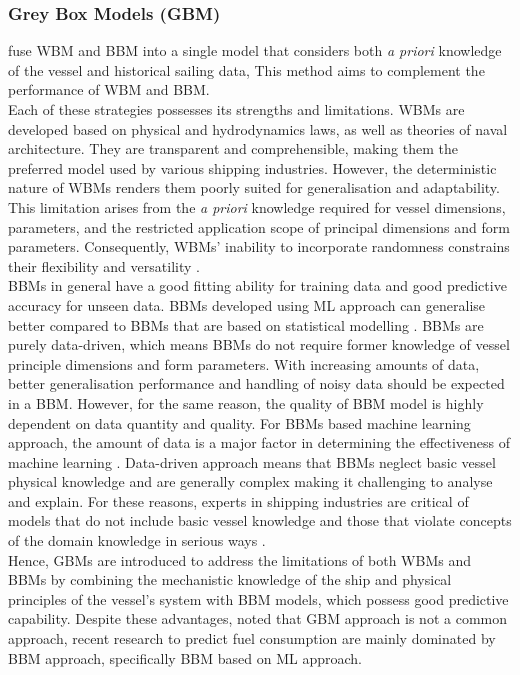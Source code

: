 \subsubsection*{\textbf{Grey Box Models (GBM)}} fuse WBM and BBM into a single model that considers both \emph{a priori} knowledge of the vessel and historical sailing data, This method aims to complement the performance of WBM and BBM.\\

Each of these strategies possesses its strengths and limitations. WBMs are developed based on physical and hydrodynamics laws, as well as theories of naval architecture. They are transparent and comprehensible, making them the preferred model used by various shipping industries. However, the deterministic nature of WBMs renders them poorly suited for generalisation and adaptability. This limitation arises from the \emph{a priori} knowledge required for vessel dimensions, parameters, and the restricted application scope of principal dimensions and form parameters. Consequently, WBMs' inability to incorporate randomness constrains their flexibility and versatility .\\

BBMs in general have a good fitting ability for training data and good predictive accuracy for unseen data. BBMs developed using ML approach can generalise better compared to BBMs that are based on statistical modelling . BBMs are purely data-driven, which means BBMs do not require former knowledge of vessel principle dimensions and form parameters. With increasing amounts of data, better generalisation performance and handling of noisy data should be expected in a BBM. However, for the same reason, the quality of BBM model is highly dependent on data quantity and quality. For BBMs based machine learning approach, the amount of data is a major factor in determining the effectiveness of machine learning . Data-driven approach means that BBMs neglect basic vessel physical knowledge and are generally complex making it challenging to analyse and explain. For these reasons, experts in shipping industries are critical of models that do not include basic vessel knowledge and those that violate concepts of the domain knowledge in serious ways .\\   

Hence, GBMs are introduced to address the limitations of both WBMs and BBMs by combining the mechanistic knowledge of the ship and physical principles of the vessel's system with BBM models, which possess good predictive capability. Despite these advantages,  noted that GBM approach is not a common approach, recent research to predict fuel consumption are mainly dominated by BBM approach, specifically BBM based on ML approach.\\

